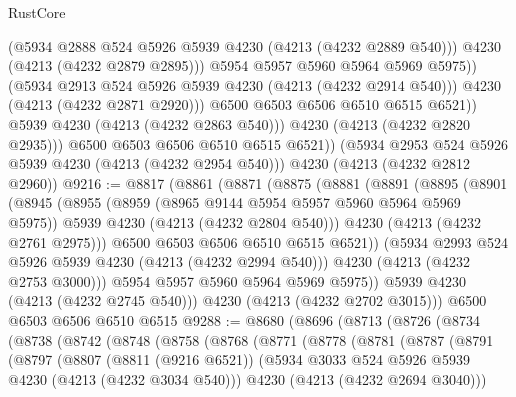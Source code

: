 \begin{lexlean}{RustCore}
\begin{coremodule}
                        (@5934 @2888 @524 @5926 @5939 @4230 (@4213 (@4232 @2889 @540)))
                        @4230
                        (@4213 (@4232 @2879 @2895)))
                      @5954
                      @5957
                      @5960
                      @5964
                      @5969
                      @5975))
                  (@5934 @2913 @524 @5926 @5939 @4230 (@4213 (@4232 @2914 @540)))
                  @4230
                  (@4213 (@4232 @2871 @2920)))
                @6500
                @6503
                @6506
                @6510
                @6515
                @6521))
            @5939
            @4230
            (@4213 (@4232 @2863 @540)))
          @4230
          (@4213 (@4232 @2820 @2935)))
        @6500
        @6503
        @6506
        @6510
        @6515
        @6521))
    (@5934 @2953 @524 @5926 @5939 @4230 (@4213 (@4232 @2954 @540)))
    @4230
    (@4213 (@4232 @2812 @2960))
@9216 := @8817
    (@8861
      (@8871
        (@8875
          (@8881
            (@8891
              (@8895
                (@8901
                  (@8945
                    (@8955
                      (@8959 (@8965 @9144 @5954 @5957 @5960 @5964 @5969 @5975))
                      @5939
                      @4230
                      (@4213 (@4232 @2804 @540)))
                    @4230
                    (@4213 (@4232 @2761 @2975)))
                  @6500
                  @6503
                  @6506
                  @6510
                  @6515
                  @6521))
              (@5934 @2993 @524 @5926 @5939 @4230 (@4213 (@4232 @2994 @540)))
              @4230
              (@4213 (@4232 @2753 @3000)))
            @5954
            @5957
            @5960
            @5964
            @5969
            @5975))
        @5939
        @4230
        (@4213 (@4232 @2745 @540)))
      @4230
      (@4213 (@4232 @2702 @3015)))
    @6500
    @6503
    @6506
    @6510
    @6515
@9288 := @8680
    (@8696
      (@8713
        (@8726
          (@8734
            (@8738
              (@8742
                (@8748
                  (@8758
                    (@8768
                      (@8771
                        (@8778
                          (@8781
                            (@8787
                              (@8791
                                (@8797
                                  (@8807
                                    (@8811 (@9216 @6521))
                                    (@5934 @3033 @524 @5926 @5939 @4230 (@4213 (@4232 @3034 @540)))
                                    @4230
                                    (@4213 (@4232 @2694 @3040)))

\end{coremodule}
\end{lexlean}
